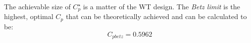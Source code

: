The achievable size of $ C_p^\star $ is a matter of the WT design. The \textit{Betz limit} is the highest, optimal $ C_p $ that can be theoretically achieved and can be calculated to be:
\begin{equation}\label{eq:betzlimit}
	C_{pbetz} = 0.5962
\end{equation}


